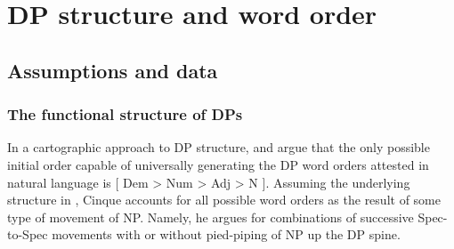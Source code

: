 \documentclass[output=paper]{langscibook}
\begin{document}
\section{DP structure and word order} 
\subsection{Assumptions and data}
\label{sec:baron:2.1}
\subsubsection{The functional structure of DPs}
\label{sec:baron:2.1.1}
In a cartographic approach to DP structure, \citet{Greenberg1963} and \citet{Cinque2005} argue that the only possible initial order capable of universally generating the DP word orders attested in natural language is [ Dem > Num > Adj > N ]. Assuming the underlying structure in , Cinque accounts for all possible word orders as the result of some type of movement of NP. Namely, he argues for combinations of successive Spec-to-Spec movements with or without pied-piping of NP up the DP spine. 
\end{document}
